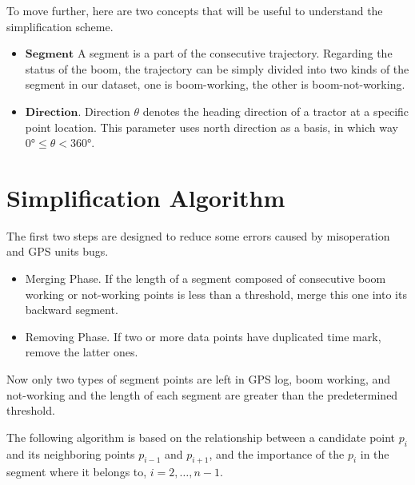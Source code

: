 To move further, here are two concepts that will be useful to understand the simplification scheme.
\begin{itemize}
\item $\mathbf{Segment}$ A segment is a part of the consecutive trajectory. Regarding the status of the boom, the trajectory can be simply divided into two kinds of the segment in our dataset, one is boom-working, the other is boom-not-working. 
\item $\mathbf{Direction}$. Direction $\theta$ denotes the heading direction of a tractor at a specific point location. This parameter uses north direction as a basis, in which way $\ang{0} \leq \theta < \ang{360}$.
\end{itemize}



\section{Simplification Algorithm}

The first two steps are designed to reduce some errors caused by misoperation and GPS units bugs.
\begin{itemize}
\item Merging Phase. If the length of a segment composed of consecutive boom working or not-working points is less than a threshold, merge this one into its backward segment. 
\item Removing Phase. If two or more data points have duplicated time mark, remove the latter ones. 
\end{itemize}
Now only two types of segment points are left in GPS log, boom working, and not-working and the length of each segment are greater than the predetermined threshold.

The following algorithm is based on the relationship between a candidate point $p_i$ and its neighboring points $p_{i-1}$ and $p_{i+1}$, and the importance of the $p_i$ in the segment where it belongs to, $i=2,\ldots,n-1$. 

